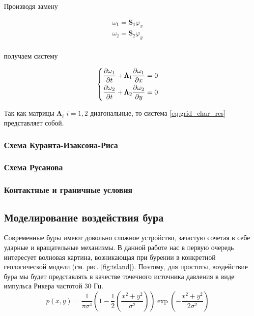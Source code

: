 Производя замену

\begin{equation}
\begin{matrix}
    \omega_1 = \pmb{S}_1 \varphi_x \\
    \omega_2 = \pmb{S}_2 \varphi_y \\
\end{matrix}
\label{eq:riman_variable}
\end{equation}

получаем систему

\begin{equation*}
\begin{dcases}
    \dfrac{\partial \omega_1}{\partial t}  +
    \pmb{\Lambda}_1 \dfrac{\partial \omega_1}{\partial x} = 0 \\
    \dfrac{\partial \omega_2}{\partial t} + 
    \pmb{\Lambda}_2 \dfrac{\partial \omega_2}{\partial y} = 0
\end{dcases}
\label{eq:grid_char_res}
\end{equation*}

Так как матрицы $\pmb{\Lambda}_i$ $i=1,2$ диагональные, то система \eqref{eq:grid_char_res} представляет собой.

\subsubsection{Схема Куранта-Изаксона-Риса}

\subsubsection{Схема Русанова}

\subsubsection{Контактные и граничные условия}

\subsection{Моделирование воздействия бура}

Современные буры имеют довольно сложное устройство, зачастую  сочетая в себе ударные и вращательные механизмы. В данной работе нас в первую очередь интересует волновая картина, возникающая при бурении в конкретной геологической модели (см. рис. \autoref{fig:island}). Поэтому, для простоты, воздействие бура мы будет представлять в качестве точечного источника давления в виде импульса Рикера частотой 30 Гц.
\begin{equation}
    p(x,y) = \dfrac{1}{\pi \sigma^4} \left(1-\dfrac{1}{2}\left(\dfrac{x^2+y^2}{\sigma^2}\right)\right) \exp\left({-\frac{x^2+y^2}{2\sigma^2}}\right)
\end{equation}

